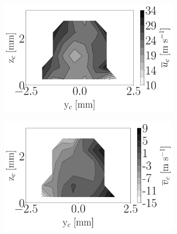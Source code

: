\begin{figure}[h!]
\begin{subfigure}[b]{0.3\textwidth}
	\centering
   \includegraphics[scale=\scaleSLIBIMER]{./part3_applications/figures_ch8_resolved/injectors_SLI/dx10_xD06p67_ux_mean_map}
\end{subfigure}
   \hspace{0.17in}
\begin{subfigure}[b]{0.3\textwidth}
	\centering
   \includegraphics[scale=\scaleSLIBIMER]{./part3_applications/figures_ch8_resolved/injectors_SLI/dx10_xD06p67_uy_mean_map}
\end{subfigure}
   \hspace{0.17in}
\begin{subfigure}[b]{0.3\textwidth}
	\centering

\end{subfigure}
\end{figure}
